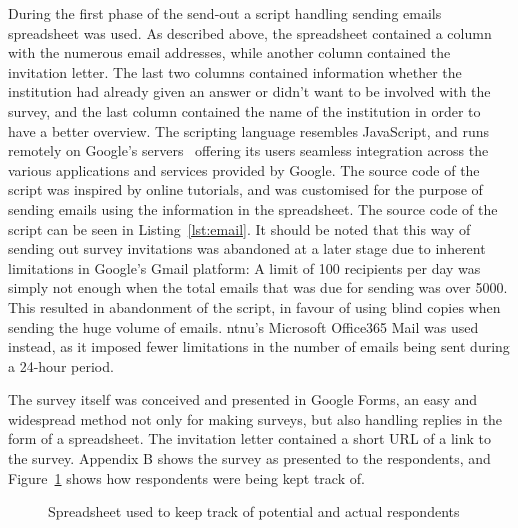 \newpage

During the first phase of the send-out a script handling sending emails spreadsheet was used. As described above, the spreadsheet contained a column with the numerous email addresses, while another column contained the invitation letter. The last two columns contained information whether the institution had already given an answer or didn't want to be involved with the survey, and the last column contained the name of the institution in order to have a better overview. The scripting language resembles JavaScript, and runs remotely on Google's servers~\cite{google2016} offering its users seamless integration across the various applications and services provided by Google. The source code of the script was inspired by online tutorials, and was customised for the purpose of sending emails using the information in the spreadsheet. The source code of the script can be seen in Listing~\ref{lst:email}. It should be noted that this way of sending out survey invitations was abandoned at a later stage due to inherent limitations in Google's Gmail platform: A limit of 100 recipients per day was simply not enough when the total emails that was due for sending was over 5000. This resulted in abandonment of the script, in favour of using blind copies when sending the huge volume of emails. \gls{ntnu}'s Microsoft Office365 Mail was used instead, as it imposed fewer limitations in the number of emails being sent during a 24-hour period.


The survey itself was conceived and presented in Google Forms, an easy and widespread method not only for making surveys, but also handling replies in the form of a spreadsheet. The invitation letter contained a short URL of a link to the survey. Appendix B shows the survey as presented to the respondents, and Figure~\ref{fig:contactsheet} shows how respondents were being kept track of.

\begin{figure}[H]
    \centering
    \caption{Spreadsheet used to keep track of potential and actual respondents}
    \label{fig:contactsheet}
\end{figure}
\newpage



